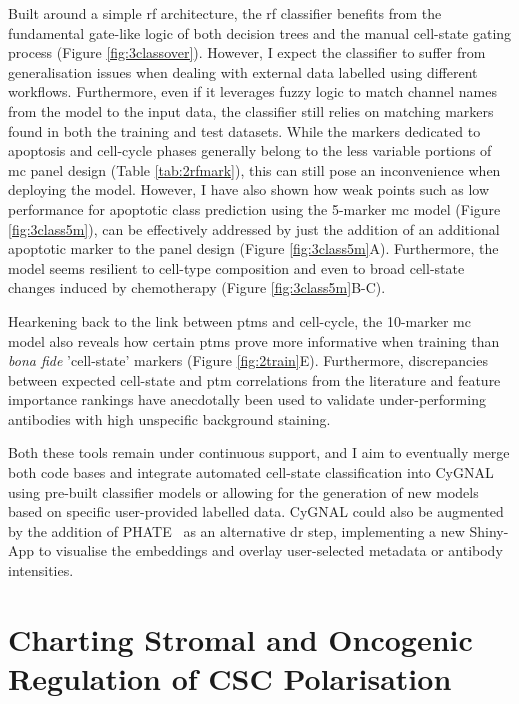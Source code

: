 Built around a simple \acrfull{rf} architecture, the \acrshort{rf} classifier benefits from the fundamental gate-like logic of both decision trees and the manual cell-state gating process (Figure \ref{fig:3classover}). However, I expect the classifier to suffer from generalisation issues when dealing with external data labelled using different workflows. Furthermore, even if it leverages fuzzy logic to match channel names from the model to the input data, the classifier still relies on matching markers found in both the training  and test datasets. While the markers dedicated to apoptosis and cell-cycle phases generally belong to the less variable portions of \acrshort{mc} panel design (Table \ref{tab:2rfmark}), this can still pose an inconvenience when deploying the model. However, I have also shown how weak points such as low performance for apoptotic class prediction using the 5-marker \acrshort{mc} model (Figure \ref{fig:3class5m}), can be effectively addressed by just the addition of an additional apoptotic marker to the panel design (Figure \ref{fig:3class5m}A). Furthermore, the model seems resilient to cell-type composition and even to broad cell-state changes induced by chemotherapy (Figure \ref{fig:3class5m}B-C).

Hearkening back to the link between \acrshort{ptm}s and cell-cycle, the 10-marker \acrshort{mc} model also reveals how certain \acrshort{ptm}s prove more informative when training than \emph{bona fide} 'cell-state' markers (Figure \ref{fig:2train}E). Furthermore, discrepancies between expected cell-state and \acrshort{ptm} correlations from the literature and feature importance rankings have anecdotally been used to validate under-performing antibodies with high unspecific background staining.

Both these tools remain under continuous support, and I aim to eventually merge both code bases and integrate automated cell-state classification into CyGNAL using pre-built classifier models or allowing for the generation of new models based on specific user-provided labelled data.
CyGNAL could also be augmented by the addition of PHATE~\cite{moon_visualizing_2019} as an alternative \acrshort{dr} step, implementing a new Shiny-App to visualise the embeddings and overlay user-selected metadata or antibody intensities.

\newpage
\section{Charting Stromal and Oncogenic Regulation of CSC Polarisation}

